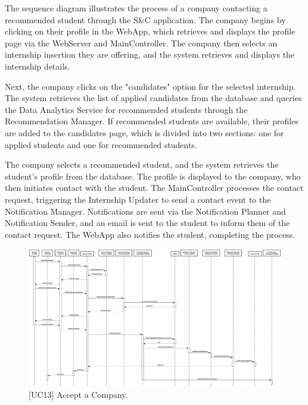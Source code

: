 The sequence diagram illustrates the process of a company contacting a recommended student through the S\&C application. The company begins by clicking on their profile in the WebApp, which retrieves and displays the profile page via the WebServer and MainController. The company then selects an internship insertion they are offering, and the system retrieves and displays the internship details.

Next, the company clicks on the "candidates" option for the selected internship. The system retrieves the list of applied candidates from the database and queries the Data Analytics Service for recommended students through the Recommendation Manager. If recommended students are available, their profiles are added to the candidates page, which is divided into two sections: one for applied students and one for recommended students.

The company selects a recommended student, and the system retrieves the student's profile from the database. The profile is displayed to the company, who then initiates contact with the student. The MainController processes the contact request, triggering the Internship Updater to send a contact event to the Notification Manager. Notifications are sent via the Notification Planner and Notification Sender, and an email is sent to the student to inform them of the contact request. The WebApp also notifies the student, completing the process.

\newpage

\begin{figure}[htbp]
    \centering
    \includegraphics[width=\linewidth]{DD/Images/sequenceDiagrams/acceptCompany.png}
    \caption{[UC13] Accept a Company.}
    \label{fig:acceptCompany_immagine}
\end{figure}



